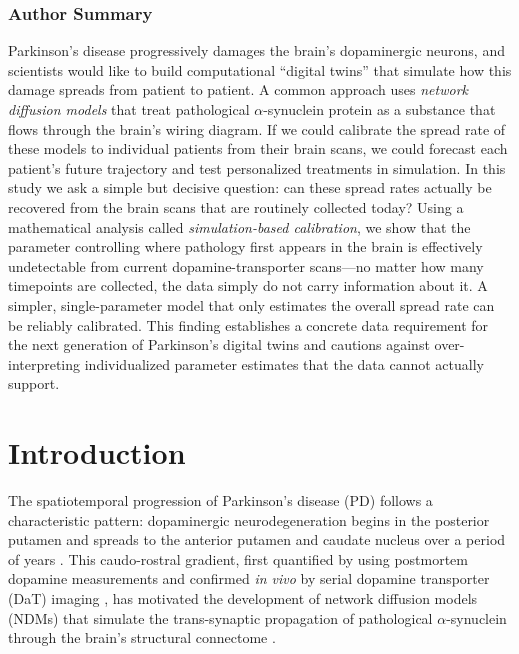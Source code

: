 
\subsubsection*{Author Summary}

\noindent
Parkinson's disease progressively damages the brain's dopaminergic neurons, and scientists would like to build computational ``digital twins'' that simulate how this damage spreads from patient to patient. A common approach uses \emph{network diffusion models} that treat pathological $\alpha$-synuclein protein as a substance that flows through the brain's wiring diagram. If we could calibrate the spread rate of these models to individual patients from their brain scans, we could forecast each patient's future trajectory and test personalized treatments in simulation. In this study we ask a simple but decisive question: can these spread rates actually be recovered from the brain scans that are routinely collected today? Using a mathematical analysis called \emph{simulation-based calibration}, we show that the parameter controlling where pathology first appears in the brain is effectively undetectable from current dopamine-transporter scans---no matter how many timepoints are collected, the data simply do not carry information about it. A simpler, single-parameter model that only estimates the overall spread rate can be reliably calibrated. This finding establishes a concrete data requirement for the next generation of Parkinson's digital twins and cautions against over-interpreting individualized parameter estimates that the data cannot actually support.

\section{Introduction}

The spatiotemporal progression of Parkinson's disease (PD) follows a characteristic pattern: dopaminergic neurodegeneration begins in the posterior putamen and spreads to the anterior putamen and caudate nucleus over a period of years \cite{brooks1990, kim2022, fearnley1991}. This caudo-rostral gradient, first quantified by \cite{kish1988} using postmortem dopamine measurements and confirmed \textit{in vivo} by serial dopamine transporter (DaT) imaging \cite{fiorenzato2021, sung2016}, has motivated the development of network diffusion models (NDMs) that simulate the trans-synaptic propagation of pathological $\alpha$-synuclein through the brain's structural connectome \cite{raj2012, pandya2019, vogel2023}.


